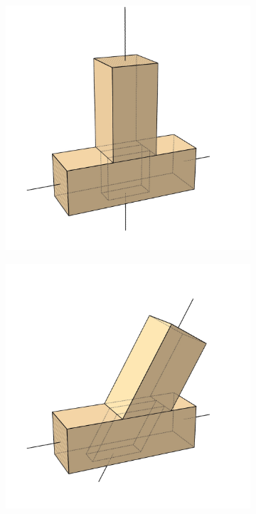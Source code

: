 \documentclass[11pt]{book}
\begin{document}
\begin{figure}[H]
\begin{subfigure}[b]{0.18\textwidth}
\end{subfigure}
\hfill
\begin{subfigure}[b]{0.18\textwidth}
\centering
\includegraphics[width=\textwidth]{./images/image14.jpg}
\end{subfigure}
\hfill
\begin{subfigure}[b]{0.18\textwidth}
\centering
\includegraphics[width=\textwidth]{./images/image1.jpg}

\end{subfigure}
\end{figure}
\end{document}
